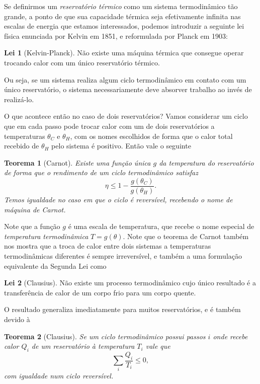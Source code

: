 \documentclass[a4paper, 12pt]{article}
\newtheorem{theorem}{Teorema}[section]
\theoremstyle{definition}
\theoremstyle{definition}
\newtheorem{law}{Lei}
\begin{document}
Se definirmos um \textit{reservatório térmico} como um sistema termodinâmico tão grande, a ponto de que
sua capacidade térmica seja efetivamente infinita nas escalas de energia que estamos interessados, podemos
introduzir a seguinte lei física enunciada por Kelvin em 1851, e reformulada por Planck em 1903:
\begin{law}[Kelvin-Planck]
    Não existe uma máquina térmica que consegue operar trocando calor com um único reservatório térmico.
\end{law}
Ou seja, se um sistema realiza algum ciclo termodinâmico em contato com um único reservatório, o sistema
necessariamente deve absorver trabalho ao invés de realizá-lo.

O que acontece então no caso de dois reservatórios? Vamos considerar um ciclo que em cada passo pode trocar 
calor com um de dois reservatórios a temperaturas $\theta_C$ e $\theta_H$, com os nomes escolhidos de forma 
que o calor total recebido de $\theta_H$ pelo sistema é positivo. Então vale o seguinte

\begin{theorem}[Carnot]
    Existe uma função única $g$ da temperatura do reservatório de forma que o rendimento de um ciclo 
    termodinâmico satisfaz
    $$\eta\leq1-\frac{g(\theta_C)}{g(\theta_H)}.$$
    Temos igualdade no caso em que o ciclo é reversível, recebendo o nome de máquina de Carnot.
\end{theorem}
Note que a função $g$ é uma escala de temperatura, que recebe o nome especial de \textit{temperatura
termodinâmica} $T=g(\theta)$. Note que o teorema de Carnot também nos mostra que a troca de calor
entre dois sistemas a temperaturas termodinâmicas diferentes é sempre irreversível, e também a uma 
formulação equivalente da Segunda Lei como

\setcounter{law}{1}
\begin{law}[Clausius]
    Não existe um processo termodinâmico cujo único resultado é a transferência de calor de um corpo frio
    para um corpo quente.
\end{law}

O resultado generaliza imediatamente para muitos reservatórios, e é também devido à
\begin{theorem}[Clausius]
    Se um ciclo termodinâmico possui passos $i$ onde recebe calor $Q_i$ de um reservatório à temperatura
    $T_i$ vale que
    $$\sum_i\frac{Q_i}{T_i}\leq0,$$
    com igualdade num ciclo reversível.
\end{theorem}
\end{document}
